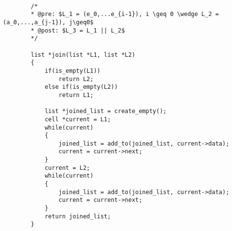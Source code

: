 \documentclass[a4paper, 11pt, oneside]{article}
\begin{document}
	\begin{lstlisting}[mathescape]	
	
		/*
		* @pre: $L_1 = (e_0,...e_{i-1}), i \geq 0 \wedge L_2 = (a_0,...,a_{j-1}), j\geq0$
		* @post: $L_3 = L_1 || L_2$
		*/
		
		list *join(list *L1, list *L2)
		{
   			if(is_empty(L1))
      			return L2;
   			else if(is_empty(L2))
      			return L1;

   			list *joined_list = create_empty();
   			cell *current = L1;
   			while(current)
   			{
      			joined_list = add_to(joined_list, current->data);
      			current = current->next;
   			}
   			current = L2;
   			while(current)
   			{
      			joined_list = add_to(joined_list, current->data);
      			current = current->next;
   			}
   			return joined_list;
		}	
	
	\end{lstlisting}
	
\end{document}
